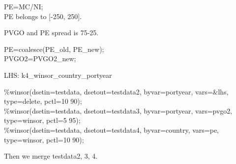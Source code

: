 

\usepackage[T1]{fontenc}




\thispagestyle{fancy}

\newcommand{\code}{\texttt}
\newcommand*{\Commonpath}{20190624}


PE=MC/NI;\\
PE belongs to [-250, 250].

PVGO and PE spread is 75-25.

PE=coalesce(PE\_old, PE\_new);\\
PVGO2=PVGO2\_new;

LHS: k4\_winsor\_country\_portyear


\%winsor(dsetin=testdata, dsetout=testdata2, byvar=portyear, vars=\&lhs, type=delete, pctl=10 90);\\
\%winsor(dsetin=testdata, dsetout=testdata3, byvar=portyear, vars=pvgo2, type=winsor, pctl=5 95);\\
\%winsor(dsetin=testdata, dsetout=testdata4, byvar=country, vars=pe, type=winsor, pctl=10 90);

Then we merge testdata2, 3, 4.









